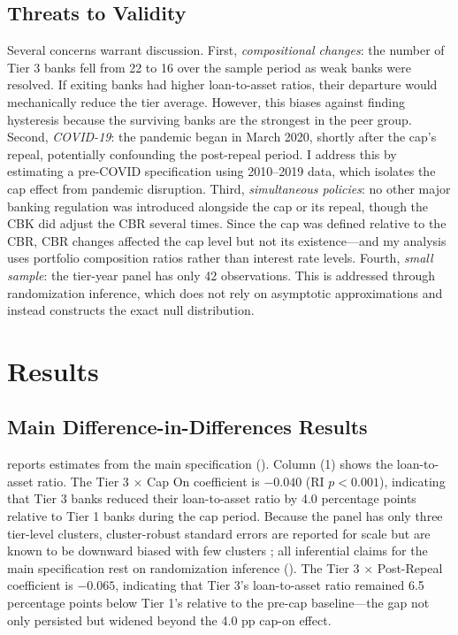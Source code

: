 \documentclass[12pt]{article}
\begin{document}
\subsection{Threats to Validity}

Several concerns warrant discussion. First, \textit{compositional changes}: the number of Tier 3 banks fell from 22 to 16 over the sample period as weak banks were resolved. If exiting banks had higher loan-to-asset ratios, their departure would mechanically reduce the tier average. However, this biases against finding hysteresis because the surviving banks are the strongest in the peer group. Second, \textit{COVID-19}: the pandemic began in March 2020, shortly after the cap's repeal, potentially confounding the post-repeal period. I address this by estimating a pre-COVID specification using 2010--2019 data, which isolates the cap effect from pandemic disruption. Third, \textit{simultaneous policies}: no other major banking regulation was introduced alongside the cap or its repeal, though the CBK did adjust the CBR several times. Since the cap was defined relative to the CBR, CBR changes affected the cap level but not its existence---and my analysis uses portfolio composition ratios rather than interest rate levels. Fourth, \textit{small sample}: the tier-year panel has only 42 observations. This is addressed through randomization inference, which does not rely on asymptotic approximations and instead constructs the exact null distribution.


\section{Results}
\label{sec:results}

\subsection{Main Difference-in-Differences Results}

 reports estimates from the main specification (). Column (1) shows the loan-to-asset ratio. The Tier 3 $\times$ Cap On coefficient is $-0.040$ (RI $p < 0.001$), indicating that Tier 3 banks reduced their loan-to-asset ratio by 4.0 percentage points relative to Tier 1 banks during the cap period. Because the panel has only three tier-level clusters, cluster-robust standard errors are reported for scale but are known to be downward biased with few clusters \citep{cameron2008bootstrap}; all inferential claims for the main specification rest on randomization inference (). The Tier 3 $\times$ Post-Repeal coefficient is $-0.065$, indicating that Tier 3's loan-to-asset ratio remained 6.5 percentage points below Tier 1's relative to the pre-cap baseline---the gap not only persisted but widened beyond the 4.0 pp cap-on effect.
\end{document}
